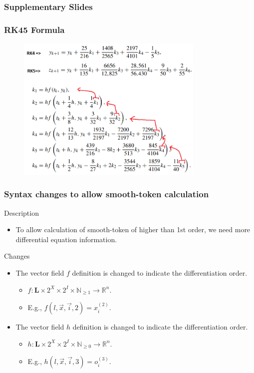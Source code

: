 \begin{frame} \frametitle{Supplementary Slides}
\end{frame}

\begin{frame} \frametitle{RK45 Formula}
	\centering
	\begin{figure}
		\includegraphics[width=0.8\textwidth]{./fig/rk45.png}
	\end{figure}
\end{frame}


\begin{frame}[c] \frametitle{ Syntax changes to allow smooth-token calculation }
	\begin{block}{Description}
		\begin{itemize}
			\item To allow calculation of smooth-token of higher than 1st order, we need more differential equation information.
		\end{itemize}
	\end{block}
	\begin{block}{Changes}
		\begin{itemize}
			\item The vector field $f$ definition is changed to indicate the differentiation order.
			\begin{itemize}
				\item $f : \mathbf{L} \times 2^X \times 2^I \times \mathbb{N}_{\geq 1} \rightarrow \mathbb{R}^n$.
				\item E.g., $f(l,\overrightarrow{x}, \overrightarrow{i}, 2) = x_i^{(2)}$.
			\end{itemize}
			\item The vector field $h$ definition is changed to indicate the differentiation order.
			\begin{itemize}
				\item $h : \mathbf{L} \times 2^X \times 2^I \times \mathbb{N}_{\geq 0} \rightarrow \mathbb{R}^n$.
				\item E.g., $h(l,\overrightarrow{x}, \overrightarrow{i}, 3) = o_i^{(3)}$.
			\end{itemize}
		\end{itemize}
	\end{block}
\end{frame}

